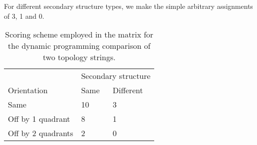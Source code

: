 \documentclass{article}
\begin{document}
For different secondary structure types, we make the simple arbitrary
assignments of 3, 1 and 0.



\begin{table}
\begin{center}
\begin{tabular}{lll}\hline
                        & \multicolumn{2}{c}{Secondary structure} \\ \cline{2-3}
Orientation             & Same  & Different     \\ \hline
Same                    & 10    & 3             \\
Off by 1 quadrant       & 8     & 1             \\
Off by 2 quadrants      & 2     & 0             \\ \hline
\end{tabular}
\end{center}
\caption{\label{tab:matrix} Scoring scheme employed in the matrix for
the dynamic programming comparison of two topology strings.}
\end{table}
\end{document}
